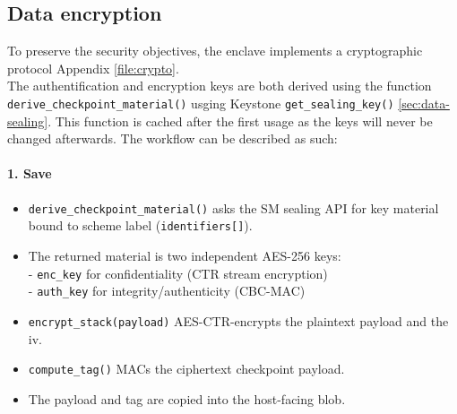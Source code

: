 \documentclass[11pt,a4paper]{report}
\begin{document}
\subsection{Data encryption}
To preserve the security objectives, the enclave implements a cryptographic protocol Appendix \ref{file:crypto}.
\\

The authentification and encryption keys are both derived using the function\\
\verb|derive_checkpoint_material()| usging Keystone \verb|get_sealing_key()| \ref{sec:data-sealing}.
This function is cached after the first usage as the keys will never be changed afterwards. The workflow can be described as such:
\paragraph{1. Save}
\begin{itemize}
    \item[a)] \texttt{derive\_checkpoint\_material()} asks the SM sealing API
    for key material bound to scheme label (\texttt{identifiers[]}).
    \item[b)] The returned material is two independent AES-256 keys:\\
        - \texttt{enc\_key} for confidentiality (CTR stream encryption)\\
        - \texttt{auth\_key} for integrity/authenticity (CBC-MAC)
    \item[c)] \texttt{encrypt\_stack(payload)} AES-CTR-encrypts the plaintext
    payload and the iv.
    \item[d)] \texttt{compute\_tag()} MACs the ciphertext checkpoint payload.
    \item[e)] The payload and tag are copied into the host-facing blob.
\end{itemize}
\end{document}
